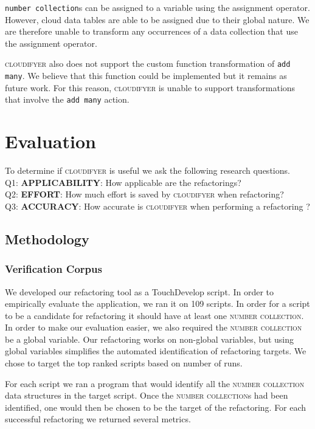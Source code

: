 \documentclass{sigplanconf}
\begin{document}
 \texttt{number collection}s can be assigned to a variable using the assignment operator.  However, cloud data tables are able to be assigned due to their global nature.  We are therefore unable to transform any occurrences of a data collection that use the assignment operator. 

\textsc{cloudifyer} also does not support the custom function transformation of \texttt{add many}.  We believe that this function could be implemented but it remains as future work.  For this reason,  \textsc{cloudifyer} is unable to support transformations that involve the \texttt{add many} action.



\section{Evaluation}
\label{sec:evaluation}
To determine if \textsc{cloudifyer} is useful we ask the following research questions.\\
Q1:  \textbf{APPLICABILITY}:  How applicable are the refactorings?\\
Q2:  \textbf{EFFORT}: How much effort is saved by \textsc{cloudifyer} when refactoring?\\
Q3:  \textbf{ACCURACY}: How accurate is \textsc{cloudifyer} when performing a refactoring ?\\
 
\subsection{Methodology}



\subsubsection{Verification Corpus}
We developed our refactoring tool as a TouchDevelop script.  In order to empirically evaluate the application, we ran it on 109 scripts.  In order for a script to be a candidate for refactoring it should have at least one \textsc{number collection}.  In order to make our evaluation easier, we also required the \textsc{number collection} be a global variable.  Our refactoring works on non-global variables, but using global variables simplifies the automated identification of refactoring targets.  We chose to target the top ranked scripts based on number of runs.

For each script we ran a program that would identify all the \textsc{number collection} data structures in the target script.  Once the \textsc{number collection}s had been identified, one would then be chosen to be the target of the refactoring.  For each successful refactoring we returned several metrics.
\end{document}
